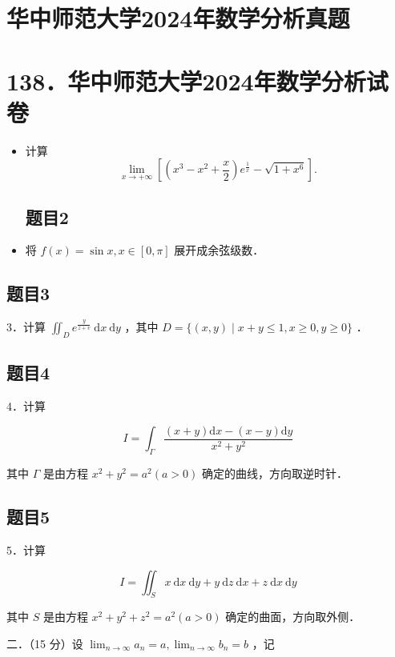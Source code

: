 \documentclass{article}
\begin{document}
\section*{华中师范大学2024年数学分析真题}
\section*{138．华中师范大学2024年数学分析试卷}
\begin{itemize}

\subsection{题目1}
  \item[1．] 计算
\[
\lim _{x \rightarrow+\infty}\left[\left(x^{3}-x^{2}+\frac{x}{2}\right) e^{\frac{1}{x}}-\sqrt{1+x^{6}}\right] .
\]

\subsection{题目2}
  \item[2．] 将 \(f(x)=\sin x, x \in[0, \pi]\) 展开成余弦级数．
\end{itemize}

\subsection{题目3}
3．计算 \(\iint_{D} e^{\frac{y}{z+v}} \mathrm{~d} x \mathrm{~d} y\) ，其中 \(D=\{(x, y) \mid x+y \leq 1, x \geq 0, y \geq 0\}\) ．

\subsection{题目4}
4．计算

\[
I=\int_{\Gamma} \frac{(x+y) \mathrm{d} x-(x-y) \mathrm{d} y}{x^{2}+y^{2}}
\]

其中 \(\Gamma\) 是由方程 \(x^{2}+y^{2}=a^{2}(a>0)\) 确定的曲线，方向取逆时针．

\subsection{题目5}
5．计算

\[
I=\iint_{S} x \mathrm{~d} x \mathrm{~d} y+y \mathrm{~d} z \mathrm{~d} x+z \mathrm{~d} x \mathrm{~d} y
\]

其中 \(S\) 是由方程 \(x^{2}+y^{2}+z^{2}=a^{2}(a>0)\) 确定的曲面，方向取外侧．

二．（15 分）设 \(\lim _{n \rightarrow \infty} a_{n}=a, \lim _{n \rightarrow \infty} b_{n}=b\) ，记
\end{document}
